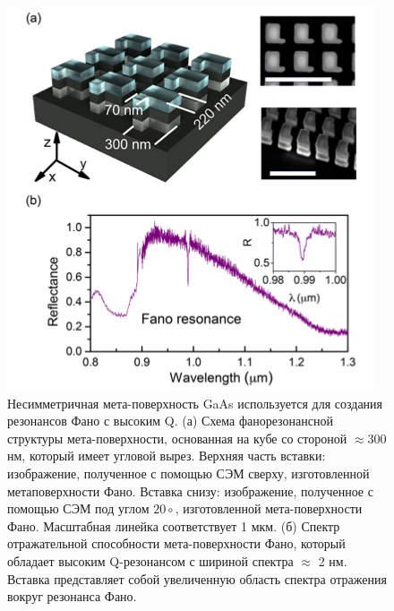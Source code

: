 \begin{figure}[h!]
    \centering
	\includegraphics[width=0.5\linewidth]{images/fig6.png}
	\caption{Несимметричная мета-поверхность GaAs используется для создания резонансов Фано с высоким Q. (а) Схема фанорезонансной структуры мета-поверхности, основанная на кубе со стороной $\approx 300$ нм, который имеет угловой вырез. Верхняя часть вставки: изображение, полученное с помощью СЭМ сверху, изготовленной метаповерхности Фано. Вставка снизу: изображение, полученное с помощью СЭМ под углом $20\circ$, изготовленной мета-поверхности Фано. Масштабная линейка соответствует 1 мкм. (б) Спектр отражательной способности мета-поверхности Фано, который обладает высоким Q-резонансом с шириной спектра $\approx$ 2 нм. Вставка представляет собой увеличенную область спектра отражения вокруг резонанса Фано. }
	\label{nonliner:matasurf}
\end{figure}

